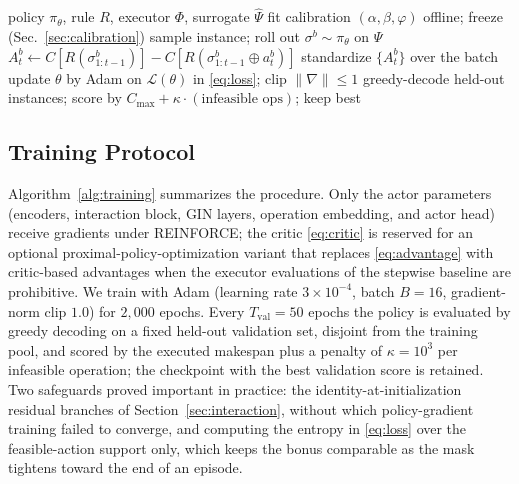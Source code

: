 \begin{algorithm}[t]
\caption{Training with counterfactual dispatch baseline}
\label{alg:training}
\begin{algorithmic}[1]
\Require policy $\pi_\theta$, rule $R$, executor $\Phi$, surrogate $\hat{\Psi}$
\State fit calibration $(\alpha,\beta,\varphi)$ offline; freeze (Sec.~\ref{sec:calibration})
    \State sample instance; roll out $\sigma^b\!\sim\!\pi_\theta$ on $\hat{\Psi}$
      \State $A^b_t \gets C[R(\sigma^b_{1:t-1})]-C[R(\sigma^b_{1:t-1}\oplus a^b_t)]$
    \EndFor
  \EndFor
  \State standardize $\{A^b_t\}$ over the batch
  \State update $\theta$ by Adam on $\mathcal{L}(\theta)$ in \eqref{eq:loss}; clip $\lVert\nabla\rVert\le1$
    \State greedy-decode held-out instances; score by
    $C_{\max}+\kappa\cdot(\text{infeasible ops})$; keep best
  \EndIf
\EndFor
\end{algorithmic}
\end{algorithm}

\subsection{Training Protocol}
\label{sec:training-details}

Algorithm~\ref{alg:training} summarizes the procedure. Only the actor
parameters (encoders, interaction block, GIN layers, operation
embedding, and actor head) receive gradients under REINFORCE; the
critic \eqref{eq:critic} is reserved for an optional
proximal-policy-optimization variant \cite{schulman2017ppo} that
replaces \eqref{eq:advantage} with critic-based advantages when the
executor evaluations of the stepwise baseline are prohibitive. We
train with Adam \cite{kingma2015adam} (learning rate $3\times10^{-4}$,
batch $B=16$, gradient-norm clip $1.0$) for $2{,}000$ epochs. Every
$T_{\mathrm{val}}=50$ epochs the policy is evaluated by greedy decoding on a fixed
held-out validation set, disjoint from the training pool, and scored
by the executed makespan plus a penalty of $\kappa=10^{3}$ per
infeasible operation; the checkpoint with the best validation score is
retained. Two safeguards proved important in practice: the
identity-at-initialization residual branches of
Section~\ref{sec:interaction}, without which policy-gradient training
failed to converge, and computing the entropy in \eqref{eq:loss} over
the feasible-action support only, which keeps the bonus comparable as
the mask tightens toward the end of an episode.

